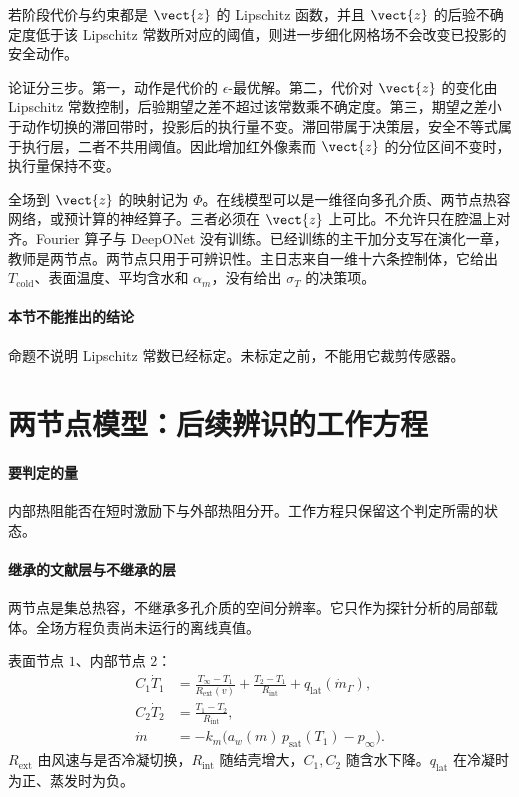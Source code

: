 \begin{proposition}[决策充分性]
若阶段代价与约束都是 \(\vect{z}\) 的 Lipschitz 函数，并且 \(\vect{z}\) 的后验不确定度低于该 Lipschitz 常数所对应的阈值，则进一步细化网格场不会改变已投影的安全动作。
\end{proposition}

论证分三步。第一，动作是代价的 \(\epsilon\)-最优解。第二，代价对 \(\vect{z}\) 的变化由 Lipschitz 常数控制，后验期望之差不超过该常数乘不确定度。第三，期望之差小于动作切换的滞回带时，投影后的执行量不变。滞回带属于决策层，安全不等式属于执行层，二者不共用阈值。因此增加红外像素而 \(\vect{z}\) 的分位区间不变时，执行量保持不变。

全场到 \(\vect{z}\) 的映射记为 \(\Phi\)。在线模型可以是一维径向多孔介质、两节点热容网络，或预计算的神经算子。三者必须在 \(\vect{z}\) 上可比。不允许只在腔温上对齐。Fourier 算子与 DeepONet 没有训练。已经训练的主干加分支写在演化一章，教师是两节点。两节点只用于可辨识性。主日志来自一维十六条控制体，它给出 \(T_{\mathrm{cold}}\)、表面温度、平均含水和 \(\alpha_m\)，没有给出 \(\sigma_T\) 的决策项。

\paragraph{本节不能推出的结论}
命题不说明 Lipschitz 常数已经标定。未标定之前，不能用它裁剪传感器。

\section{两节点模型：后续辨识的工作方程}

\paragraph{要判定的量}
内部热阻能否在短时激励下与外部热阻分开。工作方程只保留这个判定所需的状态。

\paragraph{继承的文献层与不继承的层}
两节点是集总热容，不继承多孔介质的空间分辨率。它只作为探针分析的局部载体。全场方程负责尚未运行的离线真值。

表面节点 \(1\)、内部节点 \(2\)：
\begin{align}
\label{eq:twonode}
C_1\dot T_1
&=\frac{T_\infty-T_1}{R_{\mathrm{ext}}(v)}+\frac{T_2-T_1}{R_{\mathrm{int}}}
+q_{\mathrm{lat}}(\dot m_\Gamma),\\
C_2\dot T_2
&=\frac{T_1-T_2}{R_{\mathrm{int}}},\\
\dot m
&=-k_m\big(a_w(m)\,p_{\mathrm{sat}}(T_1)-p_\infty\big).
\end{align}
\(R_{\mathrm{ext}}\) 由风速与是否冷凝切换，\(R_{\mathrm{int}}\) 随结壳增大，\(C_1,C_2\) 随含水下降。\(q_{\mathrm{lat}}\) 在冷凝时为正、蒸发时为负。


